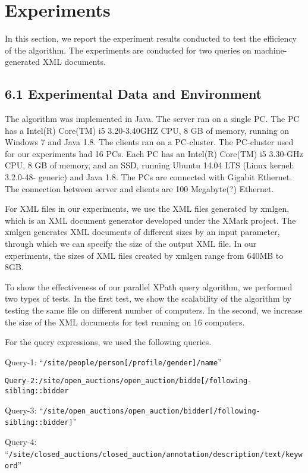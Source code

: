 \section{Experiments}

In this section, we report the experiment results conducted to test the 
efficiency of the algorithm. The experiments are conducted for two queries 
on machine-generated XML documents. 

\subsection{6.1 Experimental Data and Environment}

The algorithm was implemented in Java. The server ran on a single PC. 
The PC has a Intel(R) Core(TM) i5 3.20-3.40GHZ CPU, 8 GB of memory, running on Windows 7 and Java 1.8.
The clients ran on a PC-cluster. The PC-cluster used for our experiments had 16 PCs. 
Each PC has an Intel(R) Core(TM) i5 3.30-GHz CPU, 8 GB of memory, and an SSD, running Ubuntu 14.04 LTS (Linux kernel: 3.2.0-48- generic) and Java 1.8. The PCs are connected with Gigabit Ethernet. 
The connection between server and clients are 100 Megabyte(?) Ethernet.

For XML files in our experiments, we use the XML files generated by xmlgen, 
which is an XML document generator developed under the XMark project. 
The xmlgen generates XML documents of different sizes by an input parameter, 
through which we can specify the size of the output XML file. In our experiments, 
the sizes of XML files created by xmlgen range from 640MB to 8GB. 

To show the effectiveness of our parallel XPath query algorithm, 
we performed two types of tests. In the first test, we show the scalability of 
the algorithm by testing the same file on different number of computers. In the second, 
we increase the size of the XML documents for test running on 16 computers. 


For the query expressions, we used the following queries. 

\small Query-1:  ``\verb|/site/people/person[/profile/gender]/name|''

\verb|Query-2:/site/open_auctions/open_auction/bidde[/following-sibling::bidder|


\small Query-3:  ``\verb|/site/open_auctions/open_auction/bidder[/following-sibling::bidder]|''

\small Query-4:  ``\verb|/site/closed_auctions/closed_auction/annotation/description/text/keyword|''

